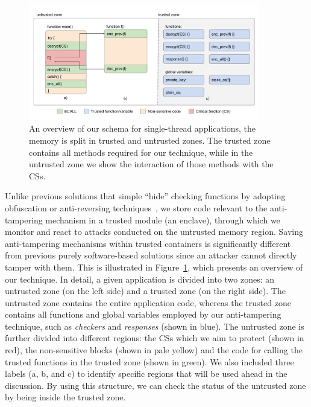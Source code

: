 \begin{figure}[t]
	\centering
	\includegraphics[width=0.9\textwidth]{fig_c3/core-all.pdf}
	\caption[Overview of single-thread schema.]{An overview of our schema for 
	single-thread applications, the memory is split in trusted and untrusted 
	zones. The trusted zone contains all methods required for our technique, 
	while in the untrusted zone we show the interaction of those methods with 
	the CSs.}
	\label{fig:core-all}
\end{figure}

Unlike previous solutions that simple ``hide'' checking functions by adopting
obfuscation or anti-reversing 
techniques~\citep{banescu2017tutorial,chang2001protecting,chen2016advanced,viticchie2016reactive},
 we store code relevant to the anti-tampering mechanism in a trusted module 
 (\ie an enclave),
through which we monitor and react to attacks conducted on
the untrusted memory region.
Saving anti-tampering mechanisms within trusted containers is significantly 
different from previous purely software-based solutions since an attacker 
cannot directly tamper with them.
This is illustrated in Figure~\ref{fig:core-all}, which presents an overview of 
our technique.
In detail, a given application is divided into two zones: an untrusted zone (on 
the left side) and a trusted zone (on the right side).
The untrusted zone contains the entire application code,
whereas the trusted zone contains all functions and global variables employed 
by our anti-tampering technique, such as \emph{checkers} and \emph{responses} 
(shown in blue).
The untrusted zone is further divided into different regions: the CSs which we 
aim to protect (shown in red), the non-sensitive blocks (shown in pale yellow) 
and the code for calling the trusted functions in the trusted zone (shown in 
green).
We also included three labels (\ie a, b, and c) to identify specific regions 
that will be used ahead in the discussion.
By using this structure, we can check the status of the untrusted zone by being 
inside the trusted zone.

